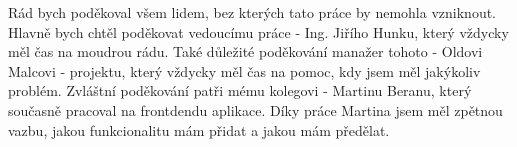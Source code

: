 Rád bych poděkoval všem lidem, bez kterých tato práce by nemohla vzniknout. Hlavně bych chtěl poděkovat vedoucímu práce - Ing. Jiřího Hunku, který vždycky měl čas na moudrou rádu. Také důležité poděkování manažer tohoto - Oldovi Malcovi - projektu, který vždycky měl čas na pomoc, kdy jsem měl jakýkoliv problém. Zvláštní poděkování patři mému kolegovi - Martinu Beranu, který současně pracoval na frontdendu aplikace. Díky práce Martina jsem měl zpětnou vazbu, jakou funkcionalitu mám přidat a jakou mám předělat.